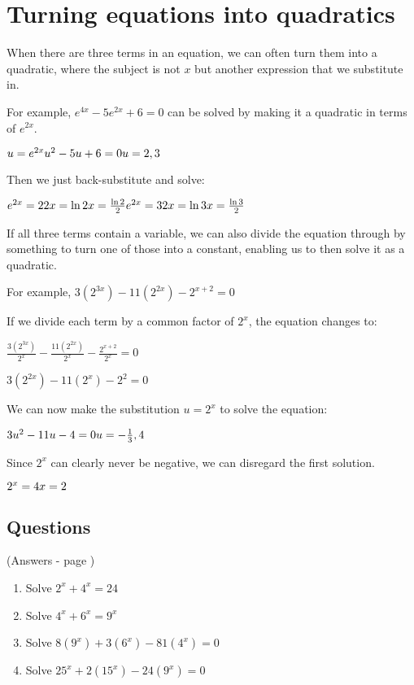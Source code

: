 \documentclass[../main.tex]{subfiles}
\begin{document}
\section{Turning equations into quadratics}
When there are three terms in an equation, we can often turn them into a quadratic, where the subject is not \(x\) but another expression that we substitute in.

For example, \(e^{4x}-5e^{2x}+6=0\) can be solved by making it a quadratic in terms of \(e^{2x}\).

\(u=e^{2x}\\
u^2-5u+6=0\\
u=2, 3\)

Then we just back-substitute and solve:

\(
e^{2x}=2     \\      
2x=\ln{2}      \\ 
x=\frac{\ln{2}}{2}\\     
e^{2x}=3\\
2x=\ln{3}\\
x=\frac{\ln{3}}{2}
\)

If all three terms contain a variable, we can also divide the equation through by something to turn one of those into a constant, enabling us to then solve it as a quadratic.

For example, \(3(2^{3x})-11(2^{2x})-2^{x+2}=0\)

If we divide each term by a common factor of \(2^x\), the equation changes to:

\(\frac{3(2^{3x})}{2^x}-\frac{11(2^{2x})}{2^x}-\frac{2^{x+2}}{2^x}=0\)

\(3(2^{2x})-11(2^x)-2^2=0\)

We can now make the substitution \(u=2^x\) to solve the equation:

\(3u^2-11u-4=0\\
u=-\frac{1}{3}, 4\)

Since \(2^x\) can clearly never be negative, we can disregard the first solution.

\(2^x=4\\
x=2\)\\

\pagebreak

\subsection*{Questions}
(Answers - page \pageref*{Quadratics answers})
\label{quadratics}
\begin{enumerate}
    \item Solve \(2^x+4^x=24\)
    
    \item Solve \(4^x+6^x=9^x\)
    
    \item Solve \(8(9^x)+3(6^x)-81(4^x)=0\)
    
    \item Solve \(25^x+2(15^x)-24(9^x)=0\)
\end{enumerate}
\end{document}

